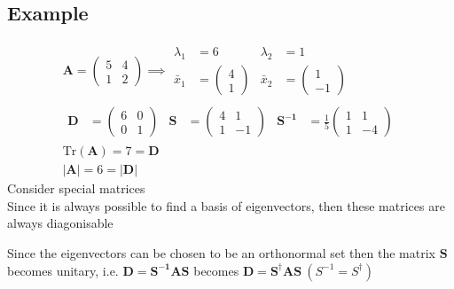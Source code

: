 \documentclass[a4paper, 11pt, normalem]{report}
\begin{document}
\subsection{Example}
\begin{gather*}
    \mathbf{A} =
    \begin{pmatrix}
        5 & 4 \\
        1 & 2
    \end{pmatrix} \implies
    \begin{aligned}
        \lambda_1 &= 6 & \lambda_2 &= 1 \\
        \bar{x}_1 &=
        \begin{pmatrix}
            4 \\
            1
        \end{pmatrix} & \bar{x}_2 &=
        \begin{pmatrix}
            1 \\
            -1
        \end{pmatrix}
    \end{aligned} \\
    \begin{aligned}
        \mathbf{D} &=
        \begin{pmatrix}
            6 & 0 \\
            0 & 1
        \end{pmatrix} & \mathbf{S} &=
        \begin{pmatrix}
            4 & 1 \\
            1 & -1
        \end{pmatrix} & \mathbf{S^{-1}} &= \frac{1}{5}
        \begin{pmatrix}
            1 & 1 \\
            1 & -4
        \end{pmatrix}
    \end{aligned} \\
    \text{Tr}(\mathbf{A}) = 7 = \mathbf{D} \\
    \mathbf{|A|} = 6 = \mathbf{|D|}
\end{gather*}
Consider special matrices \\
Since it is always possible to find a basis of eigenvectors, then these matrices are always diagonisable

Since the eigenvectors can be chosen to be an orthonormal set then the matrix $\mathbf{S}$ becomes unitary, i.e. $\mathbf{D} = \mathbf{S^{-1}AS}$ becomes $\mathbf{D} = \mathbf{S^{\dagger}AS} ~ (S^{-1} = S^{\dagger})$
\end{document}
